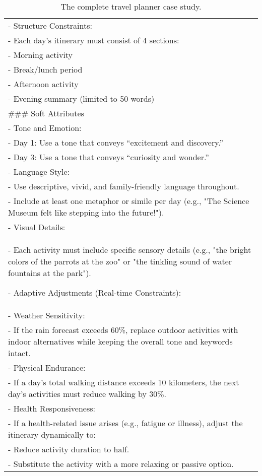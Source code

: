 \begin{table*}[htbp]
\begin{tabular}{p{14cm}}
- Structure Constraints: \\
\quad- Each day’s itinerary must consist of 4 sections: \\
\quad\quad- Morning activity \\
\quad\quad- Break/lunch period \\ 
\quad\quad- Afternoon activity \\
\quad\quad- Evening summary (limited to 50 words) \\

\#\#\# Soft Attributes \\
- Tone and Emotion: \\ 
\quad- Day 1: Use a tone that conveys “excitement and discovery.” \\ 
\quad- Day 3: Use a tone that conveys “curiosity and wonder.” \\
- Language Style: \\ 
\quad- Use descriptive, vivid, and family-friendly language throughout. \\
\quad- Include at least one metaphor or simile per day (e.g., "The Science Museum felt like stepping into the future!"). \\
- Visual Details: \\
\quad- Each activity must include specific sensory details (e.g., "the bright colors of the parrots at the zoo" or "the tinkling sound of water fountains at the park").

- Adaptive Adjustments (Real-time Constraints): \\
\quad- Weather Sensitivity: \\
\quad\quad- If the rain forecast exceeds 60\%, replace outdoor activities with indoor alternatives while keeping the overall tone and keywords intact. \\ 
\quad- Physical Endurance: \\
\quad\quad- If a day’s total walking distance exceeds 10 kilometers, the next day’s activities must reduce walking by 30\%. \\
\quad- Health Responsiveness: \\
\quad\quad- If a health-related issue arises (e.g., fatigue or illness), adjust the itinerary dynamically to: \\
\quad\quad- Reduce activity duration to half. \\ 
\quad\quad- Substitute the activity with a more relaxing or passive option. \\
\bottomrule
    \end{tabular}
    \caption{The complete travel planner case study.}
    \label{tab:travel_planner_case}
\end{table*}
